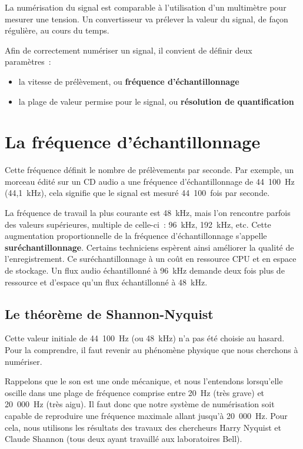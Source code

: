 \documentclass[
]{book}
\providecommand{\tightlist}{%
  \setlength{\itemsep}{0pt}\setlength{\parskip}{0pt}}
\begin{document}
La numérisation du signal est comparable à l'utilisation d'un multimètre pour mesurer une tension. Un convertisseur va prélever la valeur du signal, de façon régulière, au cours du temps.

Afin de correctement numériser un signal, il convient de définir deux paramètres~:

\begin{itemize}
\tightlist
\item
  la vitesse de prélèvement, ou \textbf{fréquence d'échantillonnage}
\item
  la plage de valeur permise pour le signal, ou \textbf{résolution de quantification}
\end{itemize}

\hypertarget{la-fruxe9quence-duxe9chantillonnage}{%
\section{La fréquence d'échantillonnage}\label{la-fruxe9quence-duxe9chantillonnage}}

Cette fréquence définit le nombre de prélèvements par seconde. Par exemple, un morceau édité sur un CD audio a une fréquence d'échantillonnage de 44~100~Hz (44,1~kHz), cela signifie que le signal est mesuré 44~100~fois par seconde.

La fréquence de travail la plus courante est 48~kHz, mais l'on rencontre parfois des valeurs supérieures, multiple de celle-ci~: 96~kHz, 192~kHz, etc. Cette augmentation proportionnelle de la fréquence d'échantillonnage s'appelle \textbf{suréchantillonnage}. Certains techniciens espèrent ainsi améliorer la qualité de l'enregistrement. Ce suréchantillonnage à un coût en ressource CPU et en espace de stockage. Un flux audio échantillonné à 96~kHz demande deux fois plus de ressource et d'espace qu'un flux échantillonné à 48~kHz.

\hypertarget{le-thuxe9oruxe8me-de-shannon-nyquist}{%
\subsection{Le théorème de Shannon-Nyquist}\label{le-thuxe9oruxe8me-de-shannon-nyquist}}

Cette valeur initiale de 44~100~Hz (ou 48~kHz) n'a pas été choisie au hasard. Pour la comprendre, il faut revenir au phénomène physique que nous cherchons à numériser.

Rappelons que le son est une onde mécanique, et nous l'entendons lorsqu'elle oscille dans une plage de fréquence comprise entre 20~Hz (très grave) et 20~000~Hz (très aigu). Il faut donc que notre système de numérisation soit capable de reproduire une fréquence maximale allant jusqu'à 20~000~Hz. Pour cela, nous utilisons les résultats des travaux des chercheurs Harry Nyquist et Claude Shannon (tous deux ayant travaillé aux laboratoires Bell).
\end{document}
